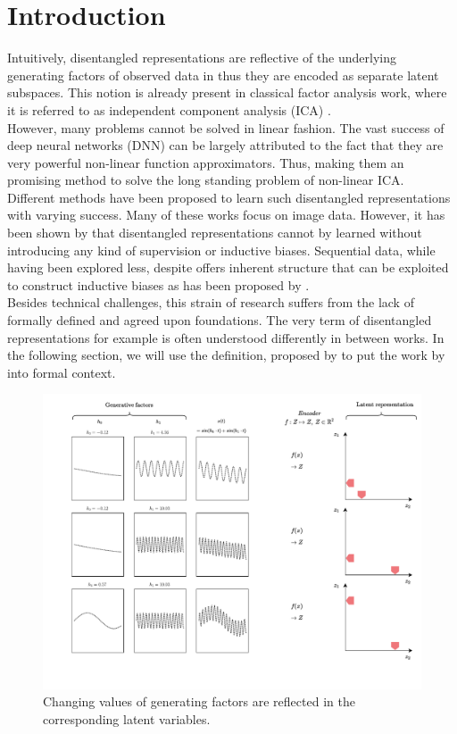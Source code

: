 \documentclass{article} %
\begin{document}
\section*{Introduction}
Intuitively, disentangled representations are reflective of the underlying generating factors of observed data in thus they are encoded as separate latent subspaces. This notion is already present in classical factor analysis work, where it is referred to as independent component analysis (ICA) \cite{comon1992independent}.\\
However, many problems cannot be solved in linear fashion. The vast success of deep neural networks (DNN) can be largely attributed to the fact that they are very powerful non-linear function approximators. Thus, making them an promising method to solve the long standing problem of non-linear ICA.\\
Different methods have been proposed to learn such disentangled representations \cite{higgins2016beta, chen2016infogan, kulkarni2015deep} with varying success. Many of these works focus on image data. However, it has been shown by \citet{locatello2019challenging} that disentangled representations cannot by learned without introducing any kind of supervision or inductive biases. Sequential data, while having been explored less, despite offers inherent structure that can be exploited to construct inductive biases as has been proposed by \citet{hsu2017unsupervised}.\\
Besides technical challenges, this strain of research suffers from the lack of formally defined and agreed upon foundations. The very term of disentangled representations for example is often understood differently in between works. In the following section, we will use the definition, proposed by \citet{higgins2018towards} to put the work by \citet{hsu2017unsupervised} into formal context. 

\begin{figure}
	\centering
	\includegraphics[width=.8\linewidth]{../figures/intution_3x3_static.pdf}
	\caption{Changing values of generating factors are reflected in the corresponding latent variables.}
\end{figure}
\end{document}

